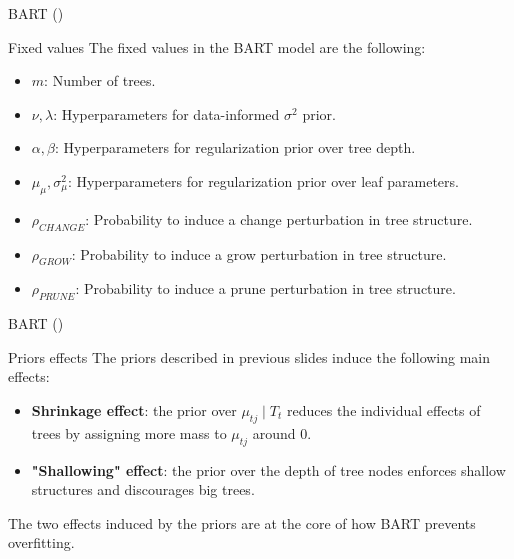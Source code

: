 \documentclass[10pt]{beamer}
\begin{document}
\begin{frame}{BART (\cite{Chipman_2010})}
   \begin{block}{Fixed values}
        The fixed values in the BART model are the following:
            \begin{itemize}
                \item $m$: Number of trees.
                \item $\nu, \lambda$: Hyperparameters for data-informed $\sigma^2$ prior.
                \item $\alpha, \beta$: Hyperparameters for regularization prior over tree depth.
                \item $\mu_\mu, \sigma_\mu^2$: Hyperparameters for regularization prior over leaf parameters.
                \item $\rho_{CHANGE}$: Probability to induce a change perturbation in tree structure.
                \item $\rho_{GROW}$: Probability to induce a grow perturbation in tree structure.
                \item $\rho_{PRUNE}$: Probability to induce a prune perturbation in tree structure.
            \end{itemize}
    \end{block}
\end{frame}

\begin{frame}{BART (\cite{Chipman_2010})}
    \begin{block}{Priors effects}
        The priors described in previous slides induce the following main effects:
        \begin{itemize}
            \item \textbf{Shrinkage effect}: the prior over $\mu_{tj} \mid T_t$ reduces the individual effects of trees by assigning more mass to $\mu_{tj}$ around $0$. 
            \item \textbf{"Shallowing" effect}: the prior over the depth of tree nodes enforces shallow structures and discourages big trees. 
        \end{itemize}
    \end{block}
    The two effects induced by the priors are at the core of how BART prevents overfitting.
\end{frame}

\end{document}
